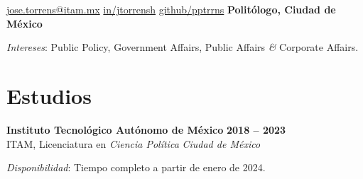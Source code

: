 \documentclass[letter]{resume}
\begin{document}
\begin{center}
{\href{mailto://jose.torrens@itam.mx}{jose.torrens@itam.mx}}
{\href{https://www.linkedin.com/in/jtorrensh/}{in/jtorrensh}}
{\href{https://github.com/pptrrns}{github/pptrrns}}
{\bf Politólogo, Ciudad de México}

\emph{Intereses}: {Public Policy, Government Affairs, Public Affairs {\em\&} Corporate Affairs.}
\end{center}

\section{Estudios}
\begin{content}
{\bf Instituto Tecnológico Autónomo de México} \emph {} \hfill {\bf 2018 -- 2023} \\ 
{ITAM, Licenciatura en \emph{Ciencia Política}} \hfill \emph {Ciudad de México}

\emph{Disponibilidad}: {Tiempo completo a partir de enero de 2024.}

\sectionlineskip
\end{content}

\end{document}

